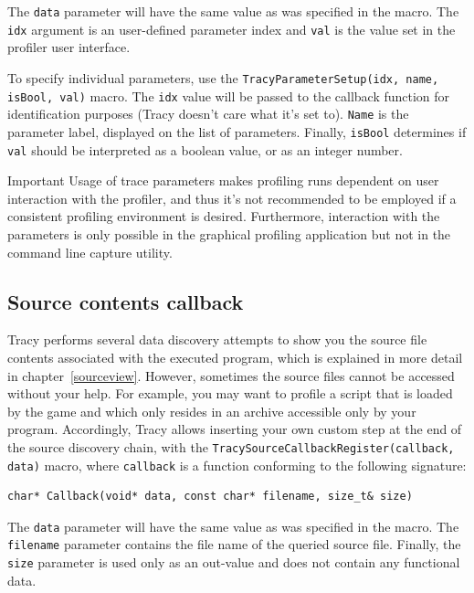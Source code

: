 \documentclass[hidelinks,titlepage,a4paper]{article}
\begin{document}
The \texttt{data} parameter will have the same value as was specified in the macro. The \texttt{idx} argument is an user-defined parameter index and \texttt{val} is the value set in the profiler user interface.

To specify individual parameters, use the \texttt{TracyParameterSetup(idx, name, isBool, val)} macro. The \texttt{idx} value will be passed to the callback function for identification purposes (Tracy doesn't care what it's set to). \texttt{Name} is the parameter label,  displayed on the list of parameters. Finally, \texttt{isBool} determines if \texttt{val} should be interpreted as a boolean value, or as an integer number.

\begin{bclogo}[
noborder=true,
couleur=black!5,
logo=\bcbombe
]{Important}
Usage of trace parameters makes profiling runs dependent on user interaction with the profiler, and thus it's not recommended to be employed if a consistent profiling environment is desired. Furthermore, interaction with the parameters is only possible in the graphical profiling application but not in the command line capture utility.
\end{bclogo}

\subsection{Source contents callback}

Tracy performs several data discovery attempts to show you the source file contents associated with the executed program, which is explained in more detail in chapter~\ref{sourceview}. However, sometimes the source files cannot be accessed without your help. For example, you may want to profile a script that is loaded by the game and which only resides in an archive accessible only by your program. Accordingly, Tracy allows inserting your own custom step at the end of the source discovery chain, with the \texttt{TracySourceCallbackRegister(callback, data)} macro, where \texttt{callback} is a function conforming to the following signature:

\begin{lstlisting}
char* Callback(void* data, const char* filename, size_t& size)
\end{lstlisting}

The \texttt{data} parameter will have the same value as was specified in the macro. The \texttt{filename} parameter contains the file name of the queried source file. Finally, the \texttt{size} parameter is used only as an out-value and does not contain any functional data.
\end{document}
